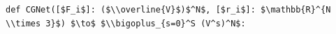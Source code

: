 \documentclass[border=10pt]{standalone}
\begin{document}
\begin{lstlisting}
def CGNet([$F_i$]: ($\\overline{V}$)$^N$, [$r_i$]: $\mathbb{R}^{N \\times 3}$) $\to$ $\\bigoplus_{s=0}^S (V^s)^N$:
\end{lstlisting}
\end{document}
